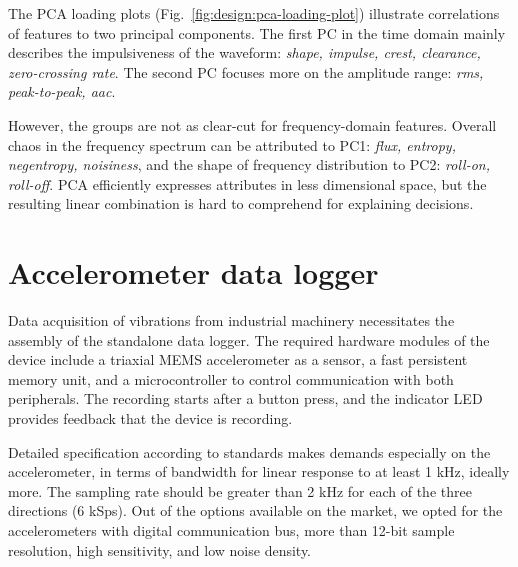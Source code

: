 The PCA loading plots (Fig.~\ref{fig:design:pca-loading-plot}) illustrate correlations of features to two principal components. The first PC in the time domain mainly describes the impulsiveness of the waveform: \emph{shape, impulse, crest, clearance, zero-crossing rate}. The second PC focuses more on the amplitude range: \emph{rms, peak-to-peak, aac}. 

However, the groups are not as clear-cut for frequency-domain features. Overall chaos in the frequency spectrum can be attributed to PC1: \emph{flux, entropy, negentropy, noisiness}, and the shape of frequency distribution to PC2: \emph{roll-on, roll-off}. PCA efficiently expresses attributes in less dimensional space, but the resulting linear combination is hard to comprehend for explaining decisions. 

\section{Accelerometer data logger}
Data acquisition of vibrations from industrial machinery necessitates the assembly of the standalone data logger. The required hardware modules of the device include a triaxial MEMS accelerometer as a sensor, a fast persistent memory unit, and a microcontroller to control communication with both peripherals. The recording starts after a button press, and the indicator LED provides feedback that the device is recording.

Detailed specification according to standards makes demands especially on the accelerometer, in terms of bandwidth for linear response to at least 1 kHz, ideally more. The sampling rate should be greater than 2 kHz for each of the three directions (6 kSps). Out of the options available on the market, we opted for the accelerometers with digital communication bus, more than 12-bit sample resolution, high sensitivity, and low noise density.

